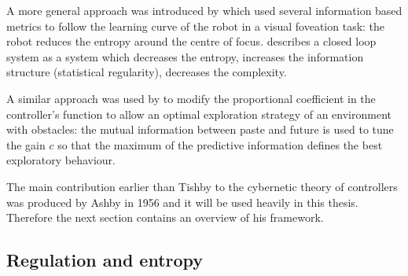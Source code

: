 A more general approach was introduced by \citet{LungarellaInformation} which
used several information based metrics to follow the learning curve of the robot
in a visual foveation task: the robot reduces the entropy around the centre of focus.
\citet{LungarellaInformation} describes a closed loop system as a system which
decreases the entropy, increases the information structure (statistical regularity),
decreases the complexity.

A similar approach was used by \citet{AyClosedLoop} to modify the proportional
coefficient in the controller's function to allow an optimal exploration strategy
of an environment with obstacles: the mutual information between paste and future
is used to tune the gain $c$ so that the maximum of the predictive information defines the best exploratory
behaviour.

The main contribution earlier than Tishby to the cybernetic theory of controllers
was produced by Ashby in 1956 and it will be used heavily in this thesis.
Therefore the next section contains an overview of his framework.

\subsection{Regulation and entropy \label{Appendix:Ashby}}

